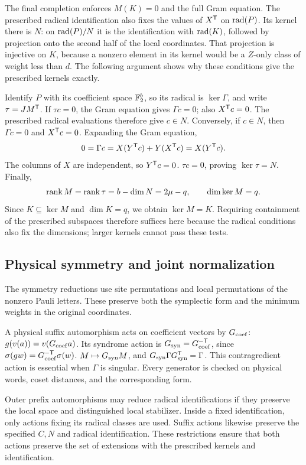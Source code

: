 The final completion enforces \(M(K)=0\) and the full Gram equation.
The prescribed radical identification also fixes the values of
\(X^\mathsf T\) on \(\operatorname{rad}(P)\). Its kernel there is \(N\):
on \(\operatorname{rad}(P)/N\) it is the identification with \(\operatorname{rad}(K)\),
followed by projection onto the second half of the local coordinates.
That projection is injective on \(K\), because a nonzero element in
its kernel would be a \(Z\)-only class of weight less than \(d\).
The following argument shows why these conditions give the prescribed
kernels exactly.

Identify \(P\) with its coefficient space \(\mathbb F_2^b\), so its radical
is \(\ker\Gamma\), and write \(\tau=JM^\mathsf T\).
If \(\tau c=0\), the Gram equation gives \(\Gamma c=0\);
also \(X^\mathsf T c=0\). The prescribed radical evaluations therefore
give \(c\in N\). Conversely, if \(c\in N\), then
\(\Gamma c=0\) and \(X^\mathsf T c=0\). Expanding the Gram equation,
\[
 0=\Gamma c=X(Y^\mathsf T c)+Y(X^\mathsf T c)=X(Y^\mathsf T c).
\]
The columns of \(X\) are independent, so \(Y^\mathsf T c=0\).
\(\tau c=0\), proving \(\ker\tau=N\). Finally,
\[
 \operatorname{rank} M=\operatorname{rank}\tau=b-\dim N=2\mu-q,
 \qquad \dim\ker M=q.
\]
Since \(K\subseteq\ker M\) and \(\dim K=q\), we obtain
\(\ker M=K\). Requiring containment of the prescribed subspaces
therefore suffices here because the radical conditions also fix the
dimensions; larger kernels cannot pass these tests.

\subsection{Physical symmetry and joint normalization}\label{app:symmetry}

The symmetry reductions use site permutations and local permutations
of the nonzero Pauli letters. These preserve both the symplectic form
and the minimum weights in the original coordinates.

A physical suffix automorphism acts on coefficient vectors by \(G_{\rm coef}\):
\(g(v(a))=v(G_{\rm coef}a)\). Its syndrome action is \(G_{\rm syn}=G_{\rm coef}^{-\mathsf T}\), since
\(\sigma(gw)=G_{\rm coef}^{-\mathsf T}\sigma(w)\). \(M\mapsto G_{\rm syn}M\), and
\(G_{\rm syn}\Gamma G_{\rm syn}^\mathsf T=\Gamma\). This contragredient action is essential
when \(\Gamma\) is singular. Every generator is checked on physical
words, coset distances, and the corresponding form.

Outer prefix automorphisms may reduce radical identifications if they
preserve the local space and distinguished local stabilizer. Inside a
fixed identification, only actions fixing its radical classes are used.
Suffix actions likewise preserve the specified \(C,N\) and radical
identification. These restrictions ensure that both actions preserve
the set of extensions with the prescribed kernels and identification.

